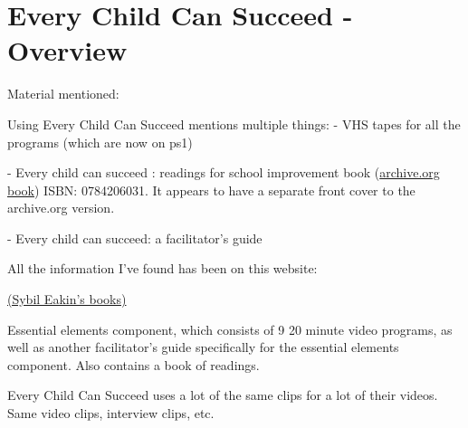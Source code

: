 \chapter{Every Child Can Succeed - Overview}

Material mentioned:

Using Every Child Can Succeed mentions multiple things:
- VHS tapes for all the programs (which are now on ps1)

- Every child can succeed : readings for school improvement book (\href{https://archive.org/details/everychildcansuc0000unse/mode/2up}{archive.org book})
ISBN: 0784206031. It appears to have a separate front cover to the archive.org version.

- Every child can succeed: a facilitator's guide

All the information I've found has been on this website:

\href{https://www.gettextbooks.co.uk/author/Sybil_Eakin}{(Sybil Eakin's books)}

Essential elements component, which consists of 9 20 minute video programs, as well as another facilitator's guide specifically for the essential elements component.
Also contains a book of readings.

Every Child Can Succeed uses a lot of the same clips for a lot of their videos. Same video clips, interview clips, etc.